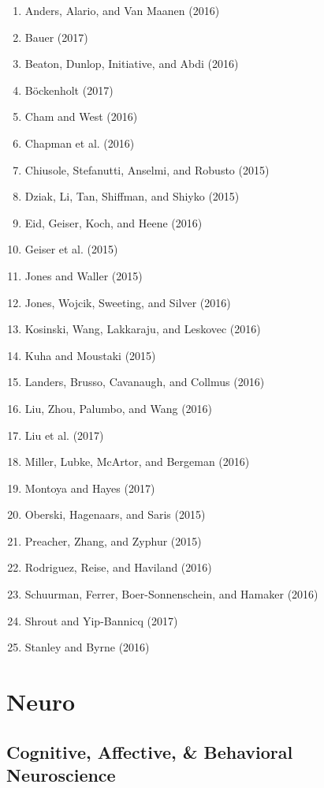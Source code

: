 \documentclass[english,man]{apa6}
\providecommand{\tightlist}{%
  \setlength{\itemsep}{0pt}\setlength{\parskip}{0pt}}
\theoremstyle{definition}
\theoremstyle{definition}
\theoremstyle{definition}
\theoremstyle{remark}
\begin{document}
\begin{enumerate}
\def\labelenumi{\arabic{enumi})}
\tightlist
\item
  Anders, Alario, and Van Maanen (2016)
\item
  Bauer (2017)
\item
  Beaton, Dunlop, Initiative, and Abdi (2016)
\item
  Böckenholt (2017)
\item
  Cham and West (2016)
\item
  Chapman et al. (2016)
\item
  Chiusole, Stefanutti, Anselmi, and Robusto (2015)
\item
  Dziak, Li, Tan, Shiffman, and Shiyko (2015)
\item
  Eid, Geiser, Koch, and Heene (2016)
\item
  Geiser et al. (2015)
\item
  Jones and Waller (2015)
\item
  Jones, Wojcik, Sweeting, and Silver (2016)
\item
  Kosinski, Wang, Lakkaraju, and Leskovec (2016)
\item
  Kuha and Moustaki (2015)
\item
  Landers, Brusso, Cavanaugh, and Collmus (2016)
\item
  Liu, Zhou, Palumbo, and Wang (2016)
\item
  Liu et al. (2017)
\item
  Miller, Lubke, McArtor, and Bergeman (2016)
\item
  Montoya and Hayes (2017)
\item
  Oberski, Hagenaars, and Saris (2015)
\item
  Preacher, Zhang, and Zyphur (2015)
\item
  Rodriguez, Reise, and Haviland (2016)
\item
  Schuurman, Ferrer, Boer-Sonnenschein, and Hamaker (2016)
\item
  Shrout and Yip-Bannicq (2017)
\item
  Stanley and Byrne (2016)
\end{enumerate}

\section{Neuro}\label{neuro}

\subsection{Cognitive, Affective, \& Behavioral
Neuroscience}\label{cognitive-affective-behavioral-neuroscience}
\end{document}
